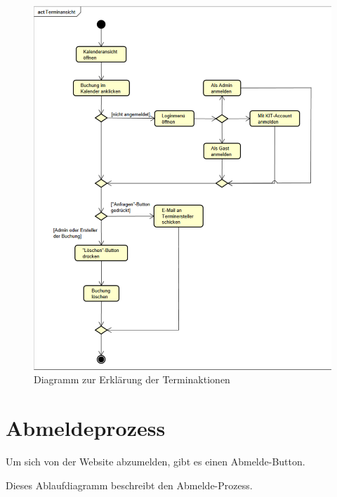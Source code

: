 \begin{figure}[ht]
    \centering
    \includegraphics[width=\textwidth]{figures/activity/terminansicht}
    \caption{Diagramm zur Erklärung der Terminaktionen}
    \label{fig:booking-actions-diagram}
\end{figure}
\clearpage

\section{Abmeldeprozess}

Um sich von der Website abzumelden, gibt es einen Abmelde-Button.

Dieses Ablaufdiagramm beschreibt den Abmelde-Prozess.

